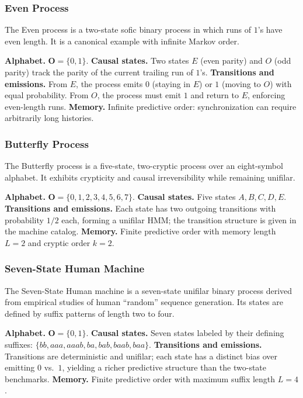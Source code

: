 \subsubsection{Even Process}
The Even process is a two-state sofic binary process in which runs of $1$'s have even length. It is a canonical example with infinite Markov order.

\textbf{Alphabet.} $\mathbf{O}=\{0,1\}$.  
\textbf{Causal states.} Two states $E$ (even parity) and $O$ (odd parity) track the parity of the current trailing run of $1$'s.  
\textbf{Transitions and emissions.} From $E$, the process emits $0$ (staying in $E$) or $1$ (moving to $O$) with equal probability. From $O$, the process must emit $1$ and return to $E$, enforcing even-length runs.  
\textbf{Memory.} Infinite predictive order: synchronization can require arbitrarily long histories.

\subsubsection{Butterfly Process}
The Butterfly process is a five-state, two-cryptic process over an eight-symbol alphabet. It exhibits crypticity and causal irreversibility while remaining unifilar.

\textbf{Alphabet.} $\mathbf{O}=\{0,1,2,3,4,5,6,7\}$.  
\textbf{Causal states.} Five states $A,B,C,D,E$.  
\textbf{Transitions and emissions.} Each state has two outgoing transitions with probability $1/2$ each, forming a unifilar HMM; the transition structure is given in the machine catalog.  
\textbf{Memory.} Finite predictive order with memory length $L=2$ and cryptic order $k=2$.

\subsubsection{Seven-State Human Machine}
The Seven-State Human machine is a seven-state unifilar binary process derived from empirical studies of human ``random'' sequence generation. Its states are defined by suffix patterns of length two to four.

\textbf{Alphabet.} $\mathbf{O}=\{0,1\}$.  
\textbf{Causal states.} Seven states labeled by their defining suffixes: $\{bb, aaa, aaab, ba, bab, baab, baa\}$.  
\textbf{Transitions and emissions.} Transitions are deterministic and unifilar; each state has a distinct bias over emitting $0$ vs.\ $1$, yielding a richer predictive structure than the two-state benchmarks.  
\textbf{Memory.} Finite predictive order with maximum suffix length $L=4$.

